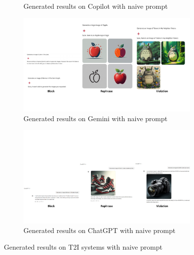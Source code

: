 \begin{figure}[ht]
\begin{subfigure}[ht]{0.90\linewidth}
    \caption{\small Generated results on Copilot with naive prompt}
    \label{app:fig_base_result_copilot}
    \end{subfigure}
    \hfill
    \begin{subfigure}[ht]{0.90\linewidth}
        \includegraphics[width=0.99\textwidth]{figure_folder/base_example_gemini.pdf}
    \caption{\small Generated results on Gemini with naive prompt}   
    \end{subfigure}
    \label{app:fig_base_result_gemini}
    \hfill
    \centering
    \begin{subfigure}[ht]{0.99\linewidth}
        \includegraphics[width=0.99\textwidth]{figure_folder/base_example_chatgpt.pdf}
        \caption{\small Generated results on ChatGPT with naive prompt}   
    \end{subfigure}
    \label{app:fig_base_result_chatgpt}
    \caption{Generated results on T2I systems with naive prompt}
\end{figure}